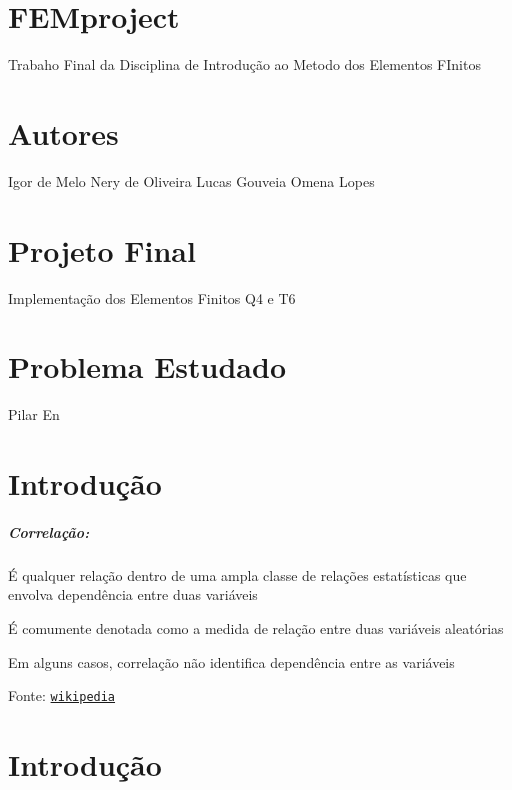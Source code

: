 \section*{F\+E\+Mproject}

Trabaho Final da Disciplina de Introdução ao Metodo dos Elementos F\+Initos

\section*{Autores}

Igor de Melo Nery de Oliveira Lucas Gouveia Omena Lopes

\section*{Projeto Final}

Implementação dos Elementos Finitos Q4 e T6

\section*{Problema Estudado}

Pilar En

\subsection*{}

\section*{Introdução}

\subparagraph*{Correlação\+:}


\begin{DoxyItemize}
\item É qualquer relação dentro de uma ampla classe de relações estatísticas que envolva dependência entre duas variáveis
\item É comumente denotada como a medida de relação entre duas variáveis aleatórias
\item Em alguns casos, correlação não identifica dependência entre as variáveis
\end{DoxyItemize}

Fonte\+: \href{https://en.wikipedia.org/wiki/Sensitivity_analysis}{\tt wikipedia} 



\section*{Introdução}

